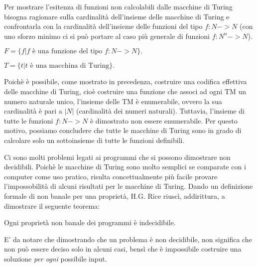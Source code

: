 Per mostrare l'esitenza di funzioni non calcolabili dalle macchine di
Turing bisogna ragionare sulla cardinalit\`a dell'insieme delle
macchine di Turing e confrontarla con la cardinalit\`a dell'insieme
delle funzioni del tipo $f:N->N$ (con uno sforzo minimo ci si pu\`o
portare al caso pi\`u generale di funzioni $f:N^n->N$).

\begin{center}
$F = \{ f | f \textrm{ \`e una funzione del tipo } f:N->N \}.$
\end{center}

\vspace{10pt}

\begin{center}
$T = \{ t | t \textrm{ \`e una macchina di Turing} \}.$
\end{center}

\vspace{10pt}

Poich\`e \`e possibile, come mostrato in precedenza, costruire una
codifica effettiva delle macchine di Turing, cio\`e costruire una
funzione che associ ad ogni TM un numero naturale unico, l'insieme
delle TM \`e enumerabile, ovvero la sua cardinalit\`a \`e pari a $|N|$
(cardinalit\`a dei numeri naturali). Tuttavia, l'insieme di tutte le
funzioni $f:N->N$ \`e dimostrato non essere enumerabile. Per questo
motivo, possiamo concludere che tutte le macchine di Turing sono in
grado di calcolare solo un sottoinsieme di tutte le funzioni
definibili.

Ci sono molti problemi legati ai programmi che si possono dimostrare
non decidibili. Poich\`e le macchine di Turing sono molto semplici se
comparate con i computer come uso pratico, risulta concettualmente
pi\`u facile provare l'impossobilit\`a di alcuni risultati per le
macchine di Turing. Dando un definizione formale di non banale per una
propriet\`a, H.G. Rice riusc\`i, addirittura, a dimostrare il seguente
teorema:

\begin{thm}
Ogni propriet\`a non banale dei programmi \`e indecidibile.
\end{thm}

E' da notare che dimostrando che un problema \`e non decidibile, non
significa che non pu\`o essere deciso solo in alcuni casi, bens\`i che
\`e impossibile costruire una soluzione \textit{per ogni} possibile
input.




